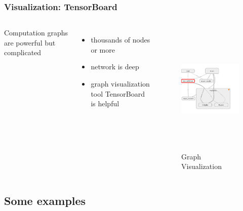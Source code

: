 \begin{frame}
  \MyLogo
  \frametitle{Visualization: TensorBoard}  

\begin{columns}
\scriptsize{
Computation graphs are powerful but complicated
\begin{itemize}
\item  thousands of nodes or more 
\item  network is deep
\item  graph visualization tool TensorBoard is helpful
\end{itemize}
}
%
\begin{figure}[htbp] 
   \includegraphics[height=2.5in]{figures/graphvisualization.png} 
\caption{Graph Visualization}
\end{figure}
\end{columns}

\end{frame}

\subsection{Some examples}

